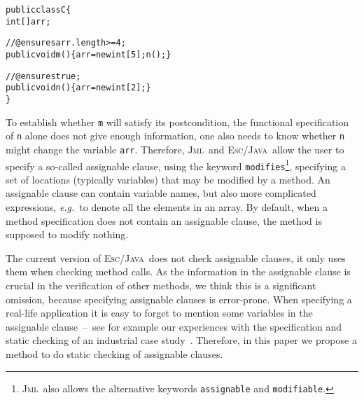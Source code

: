 \documentclass[a4paper]{llncs}
\newcommand{\jml}{\textsc{Jml}}
\newcommand{\escj}{\textsc{Esc/Java}}
\begin{document}
\begin{alltt}
public class C\verb!{!
  int[] arr;

  //@ ensures arr.length >= 4;
  public void m()\verb!{!arr = new int[5]; n();\verb!}!

  //@ ensures true;
  public void n()\verb!{!arr = new int[2];\verb!}!
\verb!}!
\end{alltt}
To establish whether \texttt{m} will satisfy its postcondition, the
functional specification of \texttt{n} alone does not give enough
information, one also needs to know whether \texttt{n} might change
the variable \texttt{arr}. Therefore, \jml\ and \escj\ allow the user
to specify a so-called assignable clause, using the keyword
\texttt{modifies}\footnote{\jml\ also allows the alternative keywords
\texttt{assignable} and \texttt{modifiable}.}, specifying a set of
locations (typically variables) that may be modified by a method. An
assignable clause can contain variable names, but also more
complicated expressions, \emph{e.g.}~to denote all the elements in an
array. By default, when a method specification does not contain an
assignable clause, the method is supposed to modify nothing. %

The current version of \escj\ does not check assignable clauses, it
only uses them when checking method calls.  As the information in the
assignable clause is crucial in the verification of other methods, we
think this is a significant omission, because specifying assignable
clauses is error-prone. When specifying a real-life application it is
easy to forget to mention some variables in the assignable
clause~--~see for example our experiences with the specification and
static checking of an industrial case
study~\cite{CatanoH02a}. Therefore, in this paper we propose a method
to do static checking of assignable clauses.



\end{document}
